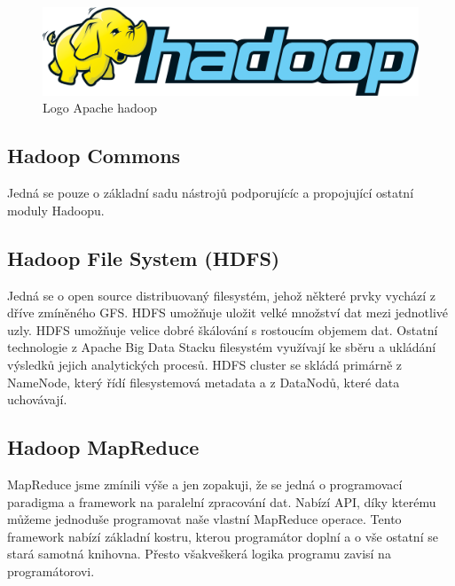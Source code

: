 \documentclass[thesis=M,czech]{FITthesis}[2012/06/26]
\begin{document}
\begin{figure}[h]
\centering
\includegraphics[scale=0.15]{images/hadoop}
\caption{Logo Apache hadoop}
\label{fig:yarn}

\end{figure}


\subsection{Hadoop Commons}
Jedná se pouze o základní sadu nástrojů podporujícíc a propojující ostatní moduly Hadoopu.


\subsection{Hadoop File System (HDFS)}
Jedná se o open source distribuovaný filesystém, jehož některé prvky vychází z dříve zmíněného GFS. HDFS umožňuje uložit velké množství dat mezi jednotlivé uzly.  HDFS umožňuje velice dobré škálování s rostoucím objemem dat. Ostatní technologie z Apache Big Data Stacku filesystém využívají ke sběru a ukládání výsledků jejich analytických procesů. HDFS cluster se skládá primárně z NameNode, který řídí filesystemová metadata a z DataNodů, které data uchovávají. 

\subsection{Hadoop MapReduce}
MapReduce jsme zmínili výše a jen zopakuji, že se jedná o programovací paradigma a framework na paralelní zpracování dat. Nabízí API, díky kterému můžeme jednoduše programovat naše vlastní MapReduce operace. Tento framework nabízí základní kostru, kterou programátor doplní a o vše ostatní se stará samotná knihovna. Přesto všakveškerá logika programu zavisí na programátorovi. 
\end{document}
